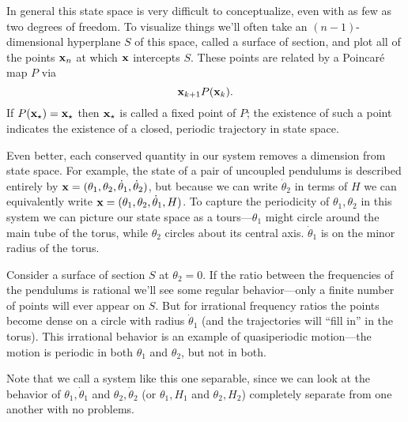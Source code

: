 \documentclass[../p111main.tex]{subfiles}
\begin{document}
In general this state space is very difficult to conceptualize, even with as few as two degrees of freedom.
To visualize things we'll often take an $(n-1)$-dimensional hyperplane $S$ of this space, called a surface of section, and plot all of the points $\mathbf{x}_n$ at which $\mathbf{x}$ intercepts $S$.
These points are related by a Poincaré map $P$ via
\[ \mathbf{x}_{k+1} P(\mathbf{x}_k). \]
If $P(\mathbf{x}_\star) = \mathbf{x}_\star$ then $\mathbf{x}_\star$ is called a fixed point of $P$; the existence of such a point indicates the existence of a closed, periodic trajectory in state space.

Even better, each conserved quantity in our system removes a dimension from state space.
For example, the state of a pair of uncoupled pendulums is described entirely by $\mathbf{x} = (\theta_1, \theta_2, \dot \theta_1, \dot \theta_2)$, but because we can write $\dot \theta_2$ in terms of $H$ we can equivalently write $\mathbf{x} = (\theta_1, \theta_2, \dot \theta_1, H)$.
To capture the periodicity of $\theta_1, \theta_2$ in this system we can picture our state space as a tours---$\theta_1$ might circle around the main tube of the torus, while $\theta_2$ circles about its central axis.
$\dot \theta_1$ is on the minor radius of the torus.

Consider a surface of section $S$ at $\theta_2 = 0$.
If the ratio between the frequencies of the pendulums is rational we'll see some regular behavior---only a finite number of points will ever appear on $S$.
But for irrational frequency ratios the points become dense on a circle with radius $\dot \theta_1$ (and the trajectories will ``fill in'' in the torus).
This irrational behavior is an example of quasiperiodic motion---the motion is periodic in both $\theta_1$ and $\theta_2$, but not in both.

Note that we call a system like this one separable, since we can look at the behavior of $\theta_1, \dot \theta_1$ and $\theta_2, \dot \theta_2$ (or $\theta_1, H_1$ and $\theta_2, H_2$) completely separate from one another with no problems.
\end{document}
